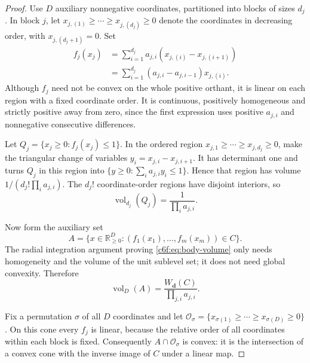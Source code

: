 \documentclass[11pt,a4paper]{article}
\theoremstyle{remark}\newtheorem{remark}[theorem]{Remark}
\begin{document}
\begin{proof}
Use $D$ auxiliary nonnegative coordinates, partitioned into blocks of
sizes $d_j$.  In block $j$, let
$x_{j,(1)}\ge\cdots\ge x_{j,(d_j)}\ge0$ denote the coordinates
in decreasing order, with $x_{j,(d_j+1)}=0$.  Set
\begin{align*}
 f_j(x_j)
  &=\sum_{i=1}^{d_j}a_{j,i}
           (x_{j,(i)}-x_{j,(i+1)})\\
  &=\sum_{i=1}^{d_j}(a_{j,i}-a_{j,i-1})x_{j,(i)}.
\end{align*}
Although $f_j$ need not be convex on the whole positive orthant, it
is linear on each region with a fixed coordinate order.  It is
continuous, positively homogeneous and strictly positive away from
zero, since the first expression uses positive $a_{j,i}$ and
nonnegative consecutive differences.

Let $Q_j=\{x_j\ge0:f_j(x_j)\le1\}$.  In the ordered region
$x_{j,1}\ge\cdots\ge x_{j,d_j}\ge0$, make the triangular change
of variables $y_i=x_{j,i}-x_{j,i+1}$.  It has determinant one and
turns $Q_j$ in this region into
$\{y\ge0:\sum_i a_{j,i}y_i\le1\}$.  Hence that region has
volume $1/(d_j!\prod_i a_{j,i})$.  The $d_j!$ coordinate-order
regions have disjoint interiors, so
\begin{equation}\label{c6f:eq:aux-volume}
 \operatorname{vol}_{d_j}(Q_j)=\frac1{\prod_i a_{j,i}}.
\end{equation}

Now form the auxiliary set
\[
 A=\{x\in\mathbb R_{\ge0}^{D}:
                (f_1(x_1),\ldots,f_m(x_m))\in C\}.
\]
The radial integration argument proving
\eqref{c6f:eq:body-volume} only needs homogeneity and the volume of
the unit sublevel set; it does not need global convexity.  Therefore
\begin{equation}\label{c6f:eq:A-volume}
 \operatorname{vol}_D(A)
   =\frac{W_{\boldsymbol d}(C)}
          {\prod_{j,i}a_{j,i}}.
\end{equation}

Fix a permutation $\sigma$ of all $D$ coordinates and let
$\mathcal O_\sigma=\{x_{\sigma(1)}\ge\cdots\ge
x_{\sigma(D)}\ge0\}$.  On this cone every $f_j$ is linear,
because the relative order of all coordinates within each block is
fixed.  Consequently $A\cap\mathcal O_\sigma$ is convex: it is
the intersection of a convex cone with the inverse image of $C$
under a linear map.


\end{proof}
\end{document}
